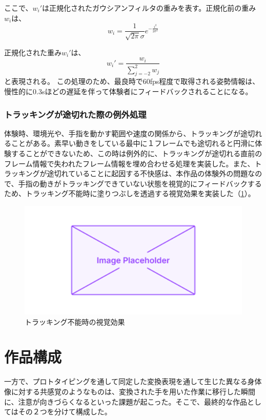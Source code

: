 ここで、\(w_i'\)は正規化されたガウシアンフィルタの重みを表す。正規化前の重み\(w_i\)は、
\begin{equation}
  w_i = \frac{1}{\sqrt{2\pi}\sigma} e^{-\frac{i^2}{2\sigma^2}}
  \end{equation}

正規化された重み\(w_i'\)は、
  \begin{equation}
  w_i' = \frac{w_i}{\sum_{j=-2}^{2} w_j}
  \end{equation}
と表現される。
この処理のため、最良時で60fps程度で取得される姿勢情報は、慢性的に0.3sほどの遅延を伴って体験者にフィードバックされることになる。

\subsubsection*{トラッキングが途切れた際の例外処理}
体験時、環境光や、手指を動かす範囲や速度の関係から、トラッキングが途切れることがある。素早い動きをしている最中に１フレームでも途切れると円滑に体験することができないため、この時は例外的に、トラッキングが途切れる直前のフレーム情報で失われたフレーム情報を埋め合わせる処理を実装した。また、トラッキングが途切れていることに起因する不快感は、本作品の体験外の問題なので、手指の動きがトラッキングできていない状態を視覚的にフィードバックするため、トラッキング不能時に塗りつぶしを透過する視覚効果を実装した（\ref{fig:opacity}）。

\begin{figure}[H]
  \centering
  \includegraphics[width=15cm]{img/placeholder.png}
  \caption{トラッキング不能時の視覚効果}
  \label{fig:opacity}
\end{figure}

\section{作品構成}
一方で、プロトタイピングを通して同定した変換表現を通して生じた異なる身体像に対する共感覚のようなものは、変換された手を用いた作業に移行した瞬間に、注意が向きづらくなるといった課題が起こった。そこで、最終的な作品としてはその２つを分けて構成した。

